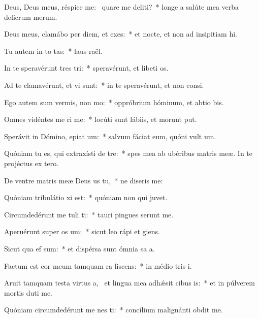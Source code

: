 \item Deus, Deus meus, réspice  me:~\pscross{} quare me deliti?~* longe a salúte mea verba delicrum merum.
\item Deus meus, clamábo per diem, et  exes:~* et nocte, et non ad insipitiam hi.
\item Tu autem in to tas:~* laus raël.
\item In te speravérunt tres tri:~* speravérunt, et libeti os.
\item Ad te clamavérunt, et vi  sunt:~* in te speravérunt, et non  consi.
\item Ego autem sum vermis,  non mo:~* oppróbrium hóminum, et abtio bis.
\item Omnes vidéntes me ri me:~* locúti sunt lábiis, et morunt put.
\item Sperávit in Dómino, epiat um:~* salvum fáciat eum, quóni vult um.
\item Quóniam tu es, qui extraxísti  de tre:~* spes mea ab ubéribus matris meæ. In te projéctus  ex tero.
\item De ventre matris meæ Deus us  tu,~* ne diseris  me:
\item Quóniam tribulátio xi est:~* quóniam non  qui juvet.
\item Circumdedérunt me tuli ti:~* tauri pingues serunt me.
\item Aperuérunt super  os um:~* sicut leo rápi et giens.
\item Sicut qua ef sum:~* et dispérsa sunt ómnia sa a.
\item Factum est cor meum tamquam ra liscens:~* in médio tris i.
\item Aruit tamquam testa virtus a,~\pscross{} et lingua mea adhǽsit cibus is:~* et in púlverem mortis duti me.
\item Quóniam circumdedérunt me nes ti:~* concílium malignánti obdit me.
